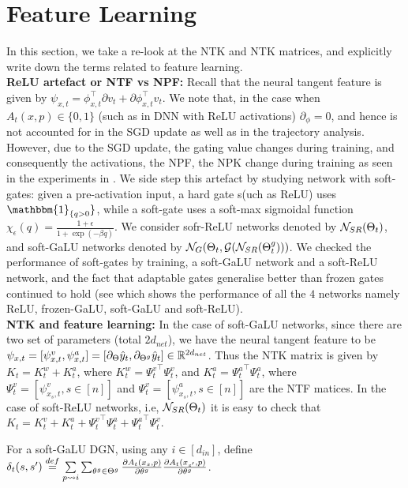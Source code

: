 \section{Feature Learning}
In this section, we take a re-look at the NTK and NTK matrices, and explicitly write down the terms related to feature learning.\hfill\\
\textbf{ReLU artefact or NTF vs NPF:} Recall that the neural tangent feature is given by $\psi_{x,t}=\phi^\top_{x,t} {\partial} v_t + {\partial} \phi^\top_{x,t} v_t$. We note that, in the case when $A_t(x,p)\in\{0,1\}$ (such as in DNN with ReLU activations)  $\partial_{\phi}=0$, and hence is not accounted for in the SGD update as well as in the trajectory analysis. However, due to the SGD update, the gating value changes during training, and consequently the activations, the NPF, the NPK change during training as seen in the experiments in . We side step this artefact by studying network with soft-gates: given a pre-activation input, a hard gate s(uch as ReLU) uses $\mathbbm{1}_{\{q>0}\}$, while a soft-gate uses a soft-max sigmoidal function $\chi_\epsilon(q)=\frac{1+\epsilon}{1+\exp(-\beta q)}$. We consider sofr-ReLU networks denoted by $\mathcal{N}_{SR}(\Theta_t)$, and soft-GaLU networks denoted by $\mathcal{N}_{G}(\Theta_t, \mathcal{G}(\mathcal{N}_{SR}({\Theta}^g_t)))$. We checked the performance of soft-gates by training, a soft-GaLU network and a soft-ReLU network, and the fact that adaptable gates generalise better than frozen gates continued to hold (see  which shows the performance of all the $4$ networks namely ReLU, frozen-GaLU, soft-GaLU and soft-ReLU).\hfill\\
\textbf{NTK and feature learning:} In the case of  soft-GaLU networks, since there are two set of parameters (total $2d_{net}$), we have the neural tangent feature to be $\psi_{x,t}=[\psi^v_{x,t},\psi^a_{x,t}]=[\partial_{\Theta} \hat{y}_t, \partial_{{\Theta}^g} \hat{y}_t]\in \mathbb{R}^{2d_{net}}$. Thus the NTK matrix is given by $K_t=K^w_t+K^a_t$,  where $K^w_t={\Psi^v_t}^\top \Psi^v_t$, and $K^a_t={\Psi^a_t}^\top \Psi^a_t$, where $\Psi^v_t=[\psi^v_{x_s,t},s\in[n]]$ and $\Psi^v_t=[\psi^a_{x_s,t},s\in[n]]$ are the NTF matices. In the case of  soft-ReLU networks, i.e, $\mathcal{N}_{SR}(\Theta_t)$  it is easy to check that $K_t={K^v_t}+{K^a_t}+{\Psi^v_t}^\top {\Psi^a_t}+{\Psi^a_t}^\top {\Psi^v_t}$.
\begin{definition} 
For a soft-GaLU DGN, using any $i\in[d_{in}]$, define $\delta_t(s,s')\stackrel{def}= \underset{{p\rightsquigarrow i}}{\sum} \sum_{\theta^g\in{\Theta}^g}\frac{\partial A_{t}(x_s,p)}{\partial \theta^g} \frac{\partial A_{t}(x_{s'},p)}{\partial \theta^g}$.
\end{definition}

